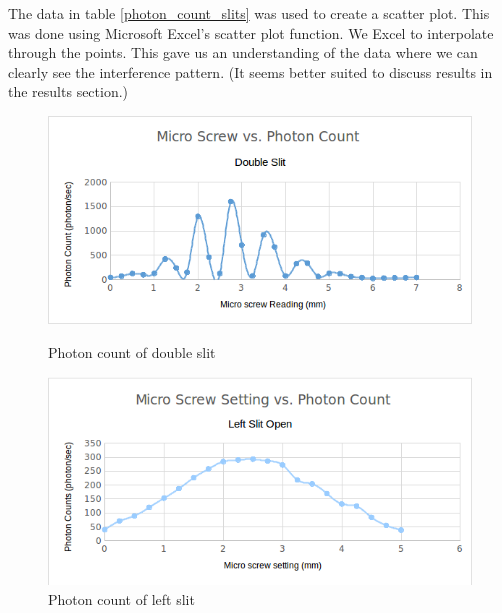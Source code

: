 \documentclass[12pt letterpaper]{article}
\begin{document}
The data in table \ref{photon_count_slits} was used to create a scatter plot. This was done using Microsoft Excel's scatter plot function. We Excel to interpolate through the points. This gave us an understanding of the data where we can clearly see the interference pattern. (It seems better suited to discuss results in the results section.)

\newpage

\vspace*{-20cm}

\begin{figure}[!h]
  \caption{Photon count of double slit}
  \centering
    \includegraphics[width=\textwidth]{photon_count_double_slit.png}
    \label{fig:photon_double}
\end{figure}


\begin{figure}[!h]
  \caption{Photon count of left slit}
  \centering
    \includegraphics[width=\textwidth]{photon_count_left_slit.png}
\end{figure}

\vspace*{3cm}
\end{document}
